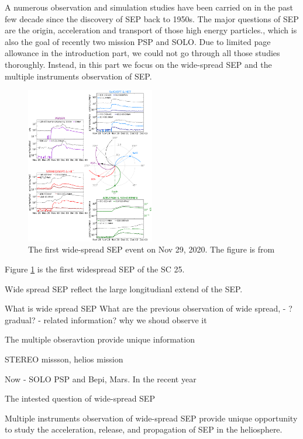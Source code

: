 A numerous observation and simulation studies have been carried on in the past few decade since the discovery of SEP back to 1950s. The major questions of SEP are the origin, acceleration and transport of those high energy particles.\cite{Desai2016_review}, which is also the goal of recently two mission PSP and SOLO. 
Due to limited page allowance in the introduction part, we could not go through all those studies thoroughly. Instead, in this part we focus on the wide-spread SEP and the multiple instruments observation of SEP.
\begin{figure}
	\centering
	\includegraphics[width = 0.5\textwidth]{images/2020-11-29_overview_plot.png}
	\caption{The first wide-spread \acl{SEP} event on Nov 29, 2020. The figure is from \citep{Kollhoff-2021}}
	\label{Fig:SEP_widespread}
\end{figure}

Figure \ref{Fig:SEP_widespread} is the first widespread SEP of the SC 25. 

Wide spread SEP reflect the large longitudianl extend of the SEP.

What is wide spread SEP
What are the previous observation of wide spread, - ? gradual? - related information?
why we shoud observe it

The multiple obseravtion provide unique information

STEREO missson, helios mission 

Now - SOLO PSP and Bepi, Mars.
In the recent year

The intested question of wide-spread SEP



Multiple instruments observation of wide-spread SEP provide unique opportunity to study the acceleration, release, and propagation of SEP in the heliosphere.



